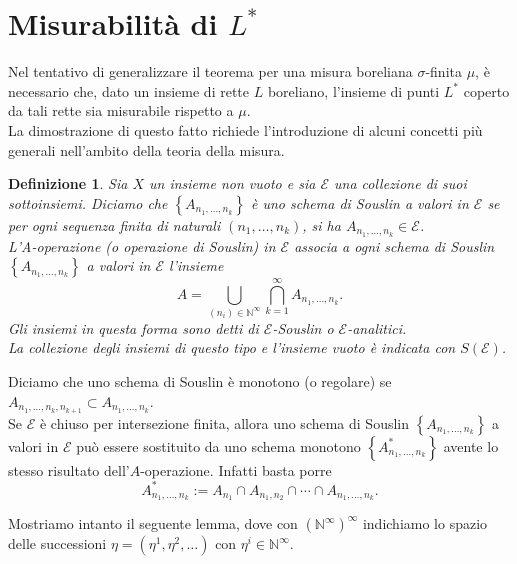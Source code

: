 \documentclass[a4paper, twoside,openright]{article}
\newcommand{\<}{\langle}
\renewcommand{\>}{\rangle}
\newtheorem{defin}[teo]{Definizione}
\begin{document}
\newpage

\section{Misurabilità di $L^*$}

Nel tentativo di generalizzare il teorema per una misura boreliana $\sigma$-finita $\mu$, è necessario che, dato un insieme di rette $L$ boreliano, l'insieme di punti $L^*$ coperto da tali rette sia misurabile rispetto a $\mu$.\\
La dimostrazione di questo fatto richiede l'introduzione di alcuni concetti più generali nell'ambito della teoria della misura.

\begin{defin}
	Sia $X$ un insieme non vuoto e sia $\mathcal{E}$ una collezione di suoi sottoinsiemi. Diciamo che $\left\{A_{n_{1}, \ldots, n_{k}}\right\}$ è uno schema di Souslin a valori in $\mathcal{E}$ se per ogni sequenza finita di naturali $\left(n_{1}, \ldots, n_{k}\right)$, si ha $A_{n_{1}, \ldots, n_{k}} \in \mathcal{E}$.\\
	L'A-operazione (o operazione di Souslin) in $\mathcal{E}$ associa a ogni schema di Souslin $\left\{A_{n_{1}, \ldots, n_{k}}\right\}$ a valori in $\mathcal{E}$ l'insieme
	$$
	A=\bigcup_{\left(n_{i}\right) \in \mathbb{N}^{\infty}} \bigcap_{k=1}^{\infty} A_{n_{1}, \ldots, n_{k}} .
	$$
	Gli insiemi in questa forma sono detti di $\mathcal{E}$-Souslin o $\mathcal{E}$-analitici. \\
	La collezione degli insiemi di questo tipo e l'insieme vuoto è indicata con $S(\mathcal{E})$.
\end{defin}	

Diciamo che uno schema di Souslin è monotono (o regolare) se $A_{n_{1}, \ldots, n_{k}, n_{k+1}} \subset A_{n_{1}, \ldots, n_{k}}$.\\
Se $\mathcal{E}$ è chiuso per intersezione finita, allora uno schema di Souslin $\left\{A_{n_{1}, \ldots, n_{k}}\right\}$ a valori in $\mathcal{E}$ può essere sostituito da uno schema monotono $\left\{A^*_{n_{1}, \ldots, n_{k}}\right\}$ avente lo stesso risultato dell'$A$-operazione. Infatti basta porre 
$$
A_{n_{1}, \ldots, n_{k}}^{*}:=A_{n_{1}} \cap A_{n_{1}, n_{2}} \cap \cdots \cap A_{n_{1}, \ldots, n_{k}} .
$$

Mostriamo intanto il seguente lemma, dove con $\left(\mathbb{N}^{\infty}\right)^{\infty}$ indichiamo lo spazio delle successioni $\eta=\left(\eta^{1}, \eta^{2}, \ldots\right)$ con $\eta^{i} \in \mathbb{N}^{\infty}$.
\end{document}
